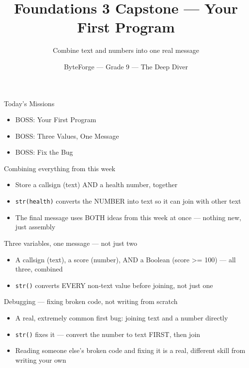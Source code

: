 \documentclass[aspectratio=169]{beamer}
\title{Foundations 3 Capstone — Your First Program}
\subtitle{Combine text and numbers into one real message}
\author{ByteForge --- Grade 9 --- The Deep Diver}
\date{}
\begin{document}
\begin{frame}
    \titlepage
\end{frame}

\begin{frame}{Today's Missions}
    \Large
    \begin{itemize}
        \item BOSS: Your First Program
        \item BOSS: Three Values, One Message
        \item BOSS: Fix the Bug
    \end{itemize}
\end{frame}

\begin{frame}{Combining everything from this week}
    \large
    \begin{itemize}
        \item Store a callsign (text) AND a health number, together
        \item \texttt{str(health)} converts the NUMBER into text so it can join with other text
        \item The final message uses BOTH ideas from this week at once --- nothing new, just assembly
    \end{itemize}
\end{frame}


\begin{frame}{Three variables, one message --- not just two}
    \large
    \begin{itemize}
        \item A callsign (text), a score (number), AND a Boolean (score >= 100) --- all three, combined
        \item \texttt{str()} converts EVERY non-text value before joining, not just one
    \end{itemize}
\end{frame}


\begin{frame}{Debugging --- fixing broken code, not writing from scratch}
    \large
    \begin{itemize}
        \item A real, extremely common first bug: joining text and a number directly
        \item \texttt{str()} fixes it --- convert the number to text FIRST, then join
        \item Reading someone else's broken code and fixing it is a real, different skill from writing your own
    \end{itemize}
\end{frame}
\end{document}
